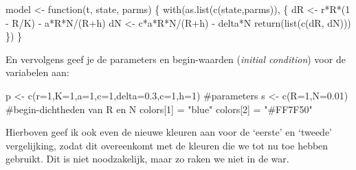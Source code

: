 \documentclass[
  a4paper,
]{scrbook}
\newenvironment{Shaded}{\begin{snugshade}}{\end{snugshade}}
\newcommand{\AttributeTok}[1]{\textcolor[rgb]{0.40,0.45,0.13}{#1}}
\newcommand{\CommentTok}[1]{\textcolor[rgb]{0.37,0.37,0.37}{#1}}
\newcommand{\ControlFlowTok}[1]{\textcolor[rgb]{0.00,0.23,0.31}{#1}}
\newcommand{\DecValTok}[1]{\textcolor[rgb]{0.68,0.00,0.00}{#1}}
\newcommand{\FloatTok}[1]{\textcolor[rgb]{0.68,0.00,0.00}{#1}}
\newcommand{\FunctionTok}[1]{\textcolor[rgb]{0.28,0.35,0.67}{#1}}
\newcommand{\NormalTok}[1]{\textcolor[rgb]{0.00,0.23,0.31}{#1}}
\newcommand{\OtherTok}[1]{\textcolor[rgb]{0.00,0.23,0.31}{#1}}
\newcommand{\SpecialCharTok}[1]{\textcolor[rgb]{0.37,0.37,0.37}{#1}}
\newcommand{\StringTok}[1]{\textcolor[rgb]{0.13,0.47,0.30}{#1}}
\theoremstyle{definition}
\theoremstyle{remark}
\begin{document}
\begin{Shaded}
\begin{Highlighting}[numbers=left,,]
\NormalTok{model }\OtherTok{\textless{}{-}} \ControlFlowTok{function}\NormalTok{(t, state, parms) \{}
  \FunctionTok{with}\NormalTok{(}\FunctionTok{as.list}\NormalTok{(}\FunctionTok{c}\NormalTok{(state,parms)), \{}
\NormalTok{    dR }\OtherTok{\textless{}{-}}\NormalTok{ r}\SpecialCharTok{*}\NormalTok{R}\SpecialCharTok{*}\NormalTok{(}\DecValTok{1} \SpecialCharTok{{-}}\NormalTok{ R}\SpecialCharTok{/}\NormalTok{K) }\SpecialCharTok{{-}}\NormalTok{ a}\SpecialCharTok{*}\NormalTok{R}\SpecialCharTok{*}\NormalTok{N}\SpecialCharTok{/}\NormalTok{(R}\SpecialCharTok{+}\NormalTok{h)}
\NormalTok{    dN }\OtherTok{\textless{}{-}}\NormalTok{ c}\SpecialCharTok{*}\NormalTok{a}\SpecialCharTok{*}\NormalTok{R}\SpecialCharTok{*}\NormalTok{N}\SpecialCharTok{/}\NormalTok{(R}\SpecialCharTok{+}\NormalTok{h) }\SpecialCharTok{{-}}\NormalTok{ delta}\SpecialCharTok{*}\NormalTok{N}
    \FunctionTok{return}\NormalTok{(}\FunctionTok{list}\NormalTok{(}\FunctionTok{c}\NormalTok{(dR, dN)))  }
\NormalTok{  \}) }
\NormalTok{\}  }
\end{Highlighting}
\end{Shaded}

En vervolgens geef je de parameters en begin-waarden (\emph{initial
condition}) voor de variabelen aan:

\begin{Shaded}
\begin{Highlighting}[]
\NormalTok{p }\OtherTok{\textless{}{-}} \FunctionTok{c}\NormalTok{(}\AttributeTok{r=}\DecValTok{1}\NormalTok{,}\AttributeTok{K=}\DecValTok{1}\NormalTok{,}\AttributeTok{a=}\DecValTok{1}\NormalTok{,}\AttributeTok{c=}\DecValTok{1}\NormalTok{,}\AttributeTok{delta=}\FloatTok{0.3}\NormalTok{,}\AttributeTok{c=}\DecValTok{1}\NormalTok{,}\AttributeTok{h=}\DecValTok{1}\NormalTok{)  }\CommentTok{\#parameters}
\NormalTok{s }\OtherTok{\textless{}{-}} \FunctionTok{c}\NormalTok{(}\AttributeTok{R=}\DecValTok{1}\NormalTok{,}\AttributeTok{N=}\FloatTok{0.01}\NormalTok{) }\CommentTok{\#begin{-}dichtheden van R en N  }
\NormalTok{colors[}\DecValTok{1}\NormalTok{] }\OtherTok{=} \StringTok{"blue"}
\NormalTok{colors[}\DecValTok{2}\NormalTok{] }\OtherTok{=} \StringTok{"\#FF7F50"}
\end{Highlighting}
\end{Shaded}

Hierboven geef ik ook even de nieuwe kleuren aan voor de `eerste' en
`tweede' vergelijking, zodat dit overeenkomt met de kleuren die we tot
nu toe hebben gebruikt. Dit is niet noodzakelijk, maar zo raken we niet
in de war.
\end{document}
